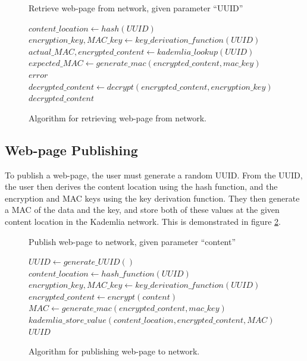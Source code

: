 \begin{figure}
    \begin{algorithm}[H]
    \caption{Retrieve web-page from network, given parameter ``UUID''}
    \begin{algorithmic}
        \STATE $content\_location \leftarrow hash(UUID)$
        \STATE $encryption\_key, MAC\_key \leftarrow key\_derivation\_function(UUID) $
        \STATE $actual\_MAC, encrypted\_content \leftarrow kademlia\_lookup(UUID) $
        \STATE $expected\_MAC \leftarrow generate\_mac(encrypted\_content, mac\_key) $
        \RETURN $ error $
        \ENDIF
        \STATE $ decrypted\_content \leftarrow decrypt(encrypted\_content, encryption\_key) $
        \RETURN $ decrypted\_content $
    \end{algorithmic}
    \end{algorithm}
    \caption{Algorithm for retrieving web-page from network.}
    \label{fig:retrievalalgo}
\end{figure}

\subsection{Web-page Publishing}

To publish a web-page, the user must generate a random UUID.
From the UUID, the user then derives the content location using the hash function,
and the encryption and MAC keys using the key derivation function.
They then generate a MAC of the data and the key, and store both of these values at the given content location
in the Kademlia network. This is demonstrated in figure \ref{fig:publishalgo}.

\begin{figure}
    \begin{algorithm}[H]
        \caption{Publish web-page to network, given parameter ``content''}
        \begin{algorithmic}
        \STATE $ UUID \leftarrow generate\_UUID() $
        \STATE $ content\_location \leftarrow hash\_function(UUID) $
        \STATE $ encryption\_key, MAC\_key \leftarrow key\_derivation\_function(UUID) $
        \STATE $ encrypted\_content \leftarrow encrypt(content) $
        \STATE $ MAC \leftarrow generate\_mac(encrypted\_content, mac\_key) $
        \STATE $ kademlia\_store\_value(content\_location, encrypted\_content, MAC) $
        \RETURN $ UUID $
        \end{algorithmic}
    \end{algorithm}
    \caption{Algorithm for publishing web-page to network.}
    \label{fig:publishalgo}
\end{figure}

